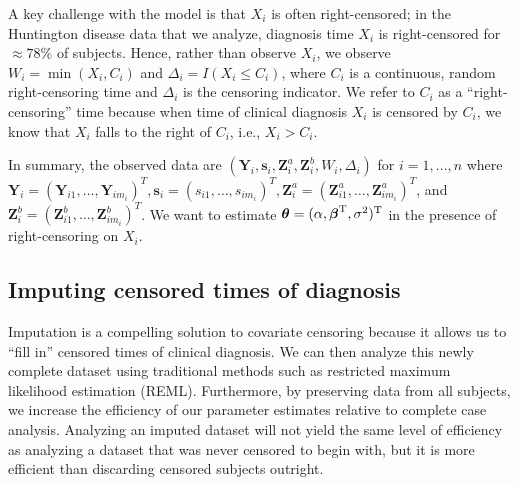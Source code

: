 \documentclass[12pt]{article}
\def\trans{^{\rm T}}
\def\bbeta{{\boldsymbol{\beta}}}
\def\btheta{{\boldsymbol{\theta}}}
\def\bs{{\boldsymbol s}}
\def\bY{{\boldsymbol Y}}
\def\bZ{{\boldsymbol Z}}
\begin{document}
A key challenge with the model is that $X_i$ is often right-censored; in the Huntington disease data that we analyze, diagnosis time $X_i$ is right-censored for $\approx 78\%$ of subjects. Hence, rather than observe $X_i$, we observe $W_i=\min(X_i,C_i)$ and $\Delta_i=I(X_i\leq C_i)$, where $C_i$ is a continuous, random right-censoring time and $\Delta_i$ is the censoring indicator. We refer to $C_i$ as a ``right-censoring'' time because when time of clinical diagnosis $X_i$ is censored by $C_i$, we know that $X_i$ falls to the right of $C_i$, i.e., $X_i > C_i$.

In summary, the observed data are $(\bY_i,\bs_i,\bZ^a_i,\bZ^b_i,W_i,\Delta_i)$ for $i=1,\ldots,n$ where  $\bY_i=(\bY_{i1},\ldots,\bY_{im_i})^T,\bs_i=(s_{i1},\ldots,s_{im_i})^T,\bZ^a_i=(\bZ^a_{i1},\ldots,\bZ^a_{im_i})^T $, and $\bZ^b_i=(\bZ^b_{i1},\ldots,\bZ^b_{im_i})^T$.
We want to estimate  $\btheta=(\alpha, \bbeta\trans, \sigma^2)\trans$ in the presence of right-censoring on $X_i$.

\subsection{Imputing censored times of diagnosis}
\label{sec:cmi}
Imputation is a compelling solution to covariate censoring because it allows us to ``fill in'' censored times of clinical diagnosis. We can then analyze this newly complete dataset using traditional methods such as restricted maximum likelihood estimation (REML). Furthermore, by preserving data from all subjects, we increase the efficiency of our parameter estimates relative to complete case analysis. Analyzing an imputed dataset will not yield the same level of efficiency as analyzing a dataset that was never censored to begin with, but it is more efficient than discarding censored subjects outright.
\end{document}
